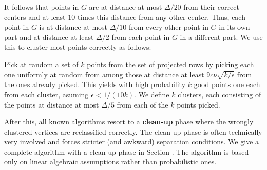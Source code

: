 \documentclass{book}
\numberwithin{exercise}{chapter}
\begin{document}
It follows that
points in $G$ are at distance at most $\Delta/20$ from their correct centers and at least $10$ times this distance from any other center. Thus, each point in $G$ is at distance at most $\Delta/10$ from every other point in $G$ in its own part and at distance at least $\Delta/2$ from each point in $G$ in a different part. We use this to cluster most points correctly as follows:

Pick at random a set of $k$ points from the set of projected rows by picking each one
uniformly at random from among those at distance at least $9c\nu\sqrt{k/\epsilon}$
from the ones already picked. This yields with high probability $k$ good points one each from each cluster, asuming $\epsilon<1/(10k)$. We define $k$ clusters, each consisting of the points at distance at most $\Delta /5$ from each of the $k$ points picked.

After this, all known algorithms resort to a {\bf clean-up} phase
where the wrongly clustered vertices are reclassified correctly. The clean-up phase is
often technically very involved and forces stricter (and awkward) separation conditions.
We give a complete algorithm with a clean-up phase in Section \label{LAcluster}.
The algorithm is based only on linear algebraic assumptions rather than
probabilistic ones.
\end{document}
